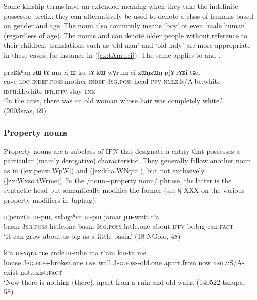 Some kinship terms have an extended meaning when they take the indefinite possessor prefix: they can alternatively be used to denote a class of humans based on gender and age. The noun  also commonly means `boy' or even `male human' (regardless of age). The nouns  and  can denote older people without reference to their children; translations such as `old man' and `old lady' are more appropriate in these cases, for instance in (\ref{ex:tAmu.ci}). The same applies to   and .


\begin{exe}
\ex \label{ex:tAmu.ci}
\gll praʁkʰaŋ  zɯ tɤ-mu ci ɯ-ku tɤ-kɯ-wɣrum ci zɯŋzɯŋ pjɤ-rɤʑi tɕe, \\
cave \textsc{loc} \textsc{indef.poss}-mother \textsc{indef} \textsc{3sg}.\textsc{poss}-head \textsc{pfv}-\textsc{nmlz}:S/A-be.white \textsc{idph}:II:white \textsc{ifr}.\textsc{ipfv}-stay \textsc{lnk} \\
\glt `In the cave, there was an old woman whose hair was completely white.' (2003sras, 69)
\end{exe}

\subsubsection{Property nouns} \label{sec:property.nouns}
Property nouns are a subclass of IPN that designate a entity that possesses a particular (mainly derogative) characteristic. They generally follow another noun as in (\ref{ex:penzi.WpW}) and (\ref{ex:kha.WNqra}), but not exclusively (\ref{ex:Wxso.tWrme}). In the /noun+property noun/ phrase, the latter is the syntactic head but semantically modifies the former (see § XXX on the various property modifiers in Japhug).  

\begin{exe}
\ex \label{ex:penzi.WpW}
 \gll <penzi> ɯ-pɯ, sɤlaŋpʰɤn ɯ-pɯ jamar ɲɯ-wxti cʰa  \\
 basin \textsc{3sg.poss}-little.one   basin \textsc{3sg.poss}-little.one  about \textsc{ipfv}-be.big can:\textsc{fact} \\
 \glt `It can grow about as big as a little basin.' (18-NGolo, 48)
\end{exe}

\begin{exe}
\ex \label{ex:kha.WNqra}
 \gll
kʰa ɯ-ɴqra tɕe znde ɯ-mbe ma tʰam kɯ-tu me. \\
house \textsc{3sg.poss}-broken.one \textsc{lnk} wall \textsc{3sg.poss}-old.one apart.from now \textsc{nmlz}:S/A-exist not.exist:\textsc{fact} \\ 
\glt `Now there is nothing (there), apart from a ruin and old walls. (140522 tshupa, 58)
\end{exe}

